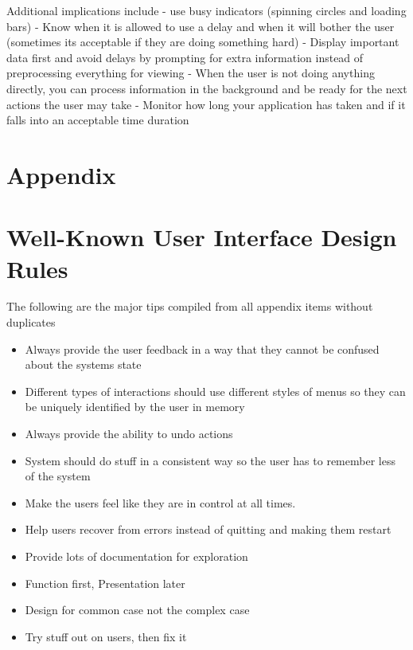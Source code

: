 \documentclass[11pt,]{article}
\providecommand{\tightlist}{%
  \setlength{\itemsep}{0pt}\setlength{\parskip}{0pt}}
\begin{document}
Additional implications include - use busy indicators (spinning circles
and loading bars) - Know when it is allowed to use a delay and when it
will bother the user (sometimes its acceptable if they are doing
something hard) - Display important data first and avoid delays by
prompting for extra information instead of preprocessing everything for
viewing - When the user is not doing anything directly, you can process
information in the background and be ready for the next actions the user
may take - Monitor how long your application has taken and if it falls
into an acceptable time duration

\hypertarget{appendix}{%
\section{Appendix}\label{appendix}}

\hypertarget{well-known-user-interface-design-rules}{%
\section{Well-Known User Interface Design
Rules}\label{well-known-user-interface-design-rules}}

The following are the major tips compiled from all appendix items
without duplicates

\begin{itemize}
\tightlist
\item
  Always provide the user feedback in a way that they cannot be confused
  about the systems state
\item
  Different types of interactions should use different styles of menus
  so they can be uniquely identified by the user in memory
\item
  Always provide the ability to undo actions
\item
  System should do stuff in a consistent way so the user has to remember
  less of the system
\item
  Make the users feel like they are in control at all times.
\item
  Help users recover from errors instead of quitting and making them
  restart
\item
  Provide lots of documentation for exploration
\item
  Function first, Presentation later
\item
  Design for common case not the complex case
\item
  Try stuff out on users, then fix it
\end{itemize}
\end{document}
